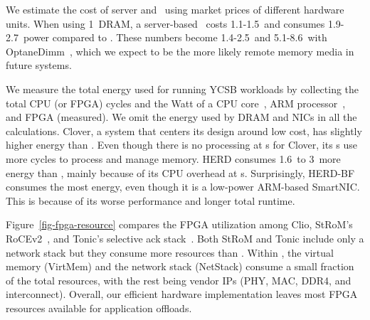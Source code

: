 We estimate the cost of server and \sysboard\ using market prices of different hardware units. When using 1\TB\ DRAM, a server-based \MN\ costs 1.1-1.5\x\ and consumes 1.9-2.7\x\ power compared to \sysboard. These numbers become 1.4-2.5\x\ and 5.1-8.6\x\ with OptaneDimm~\cite{optane-dcpm}, which we expect to be the more likely remote memory media in future systems.


We measure the total energy used for running YCSB workloads
by collecting the total CPU (or FPGA) cycles and the Watt of a CPU core~\cite{gold5128}, ARM processor~\cite{armpower}, and FPGA (measured).
We omit the energy used by DRAM and NICs in all the calculations. 
Clover, a system that centers its design around low cost, has slightly higher energy than \sys.
Even though there is no processing at \MN{}s for Clover, its \CN{}s use more cycles to process and manage memory.
HERD consumes 1.6\x\ to 3\x\ more energy than \sys, mainly because of its CPU overhead at \MN{}s.
Surprisingly, HERD-BF consumes the most energy, even though it is a low-power ARM-based SmartNIC.
This is because of its worse performance and longer total runtime.

Figure~\ref{fig-fpga-resource} compares the FPGA utilization among Clio, StRoM's RoCEv2~\cite{StRoM}, and Tonic's selective ack stack~\cite{TONIC}.
Both StRoM and Tonic include only a network stack but they consume more resources than \sys.
Within \sys, the virtual memory (VirtMem) and
the network stack (NetStack) consume a small fraction of the total resources,
with the rest being vendor IPs (PHY, MAC, DDR4, and interconnect).
Overall, our efficient hardware implementation leaves most FPGA resources available for application offloads.
